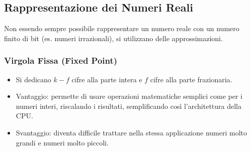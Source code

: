 \documentclass[12pt, a4paper]{article}
\begin{document}
\newpage

\subsection{Rappresentazione dei Numeri Reali}

Non essendo sempre possibile rappresentare un numero reale con un numero finito di bit (es. numeri irrazionali), si utilizzano delle approssimazioni. 

\subsubsection*{Virgola Fissa (Fixed Point)}
\begin{itemize}
    \item Si dedicano $k-f$ cifre alla parte intera e $f$ cifre alla parte frazionaria. 
    \item Vantaggio: permette di usare operazioni matematiche semplici come per i numeri interi, riscalando i risultati, semplificando così l'architettura della CPU. 
    \item Svantaggio: diventa difficile trattare nella stessa applicazione numeri molto grandi e numeri molto piccoli. 
\end{itemize}
\end{document}

